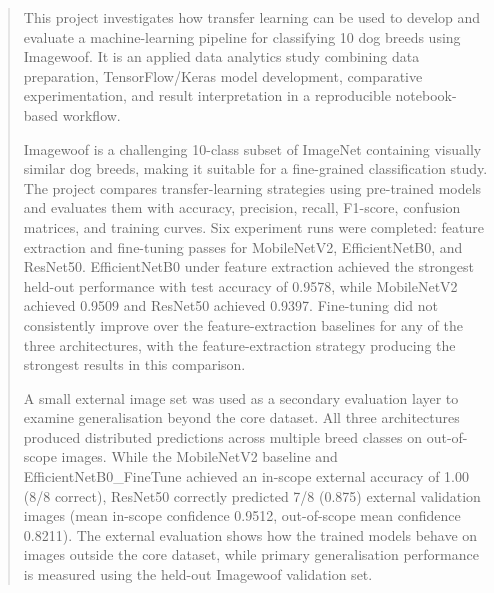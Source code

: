 \documentclass[12pt, a4paper]{article}
\begin{document}
\begin{abstract}
This project investigates how transfer learning can be used to develop and evaluate a machine-learning pipeline for classifying 10 dog breeds using Imagewoof. It is an applied data analytics study combining data preparation, TensorFlow/Keras model development, comparative experimentation, and result interpretation in a reproducible notebook-based workflow.

Imagewoof is a challenging 10-class subset of ImageNet containing visually similar dog breeds, making it suitable for a fine-grained classification study. The project compares transfer-learning strategies using pre-trained models and evaluates them with accuracy, precision, recall, F1-score, confusion matrices, and training curves. Six experiment runs were completed: feature extraction and fine-tuning passes for MobileNetV2, EfficientNetB0, and ResNet50. EfficientNetB0 under feature extraction achieved the strongest held-out performance with test accuracy of 0.9578, while MobileNetV2 achieved 0.9509 and ResNet50 achieved 0.9397. Fine-tuning did not consistently improve over the feature-extraction baselines for any of the three architectures, with the feature-extraction strategy producing the strongest results in this comparison.

A small external image set was used as a secondary evaluation layer to examine generalisation beyond the core dataset. All three architectures produced distributed predictions across multiple breed classes on out-of-scope images. While the MobileNetV2 baseline and EfficientNetB0\_FineTune achieved an in-scope external accuracy of 1.00 (8/8 correct), ResNet50 correctly predicted 7/8 (0.875) external validation images (mean in-scope confidence 0.9512, out-of-scope mean confidence 0.8211). The external evaluation shows how the trained models behave on images outside the core dataset, while primary generalisation performance is measured using the held-out Imagewoof validation set.
\end{abstract}

\newpage

\tableofcontents

\newpage

\end{document}
